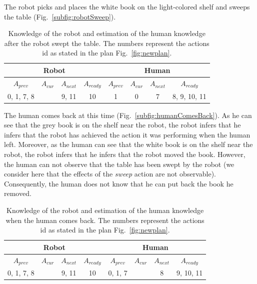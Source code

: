 \documentclass[english,a4paper,11pt,twoside]{StyleThese}
\begin{document}
The robot picks and places the white book on the light-colored shelf and sweeps the table (Fig.~\ref{subfig:robotSweep}).


\begin{table}[!h]
\begin{center}
\begin{tabular}{|c|c|c|c||c|c|c|c|}
\hline
\multicolumn{4}{|c||}{Robot} & \multicolumn{4}{c|}{Human}\\
\hline
$A_{prev}$ & $A_{cur}$ & $A_{next}$ & $A_{ready}$ & $A_{prev}$ & $A_{cur}$ & $A_{next}$ & $A_{ready}$\\
\hline
\hline
0, 1, 7, 8  &  & 9, 11 & 10 & 1 & 0 & 7 & 8, 9, 10, 11\\
\hline
\end{tabular}
\end{center}
\caption{Knowledge of the robot and estimation of the human knowledge after the robot swept the table. The numbers represent the actions id as stated in the plan Fig.~\ref{fig:newplan}.}
\label{table:results}
\end{table}

The human comes back at this time (Fig.~\ref{subfig:humanComesBack}). As he can see that the grey book is on the shelf near the robot, the robot infers that he infers that the robot has achieved the action it was performing when the human left. Moreover, as the human can see that the white book is on the shelf near the robot, the robot infers that he infers that the robot moved the book. However, the human can not observe that the table has been swept by the robot (we consider here that the effects of the \textit{sweep} action are not observable). Consequently, the human does not know that he can put back the book he removed.
\newpage

\begin{table}[!h]
\begin{center}
\begin{tabular}{|c|c|c|c||c|c|c|c|}
\hline
\multicolumn{4}{|c||}{Robot} & \multicolumn{4}{c|}{Human}\\
\hline
$A_{prev}$ & $A_{cur}$ & $A_{next}$ & $A_{ready}$ & $A_{prev}$ & $A_{cur}$ & $A_{next}$ & $A_{ready}$\\
\hline
\hline
0, 1, 7, 8  &  & 9, 11 & 10 & 0, 1, 7 &  & 8 & 9, 10, 11\\
\hline
\end{tabular}
\end{center}
\caption{Knowledge of the robot and estimation of the human knowledge when the human comes back. The numbers represent the actions id as stated in the plan Fig.~\ref{fig:newplan}.}
\label{table:results}
\end{table}
\end{document}
